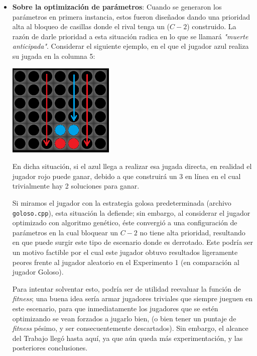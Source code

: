 \documentclass[12pt,a4paper]{article}
\begin{document}
\begin{itemize}
                \item \textbf{Sobre la optimización de parámetros}: Cuando se generaron los parámetros en primera instancia, estos fueron diseñados dando una prioridad alta al bloqueo de casillas donde el rival tenga un ($C-2$) construido. La razón de darle prioridad a esta situación radica en lo que se llamará \textit{"muerte anticipada"}. Considerar el siguiente ejemplo, en el que el jugador azul realiza su jugada en la columna 5:
                
                \begin{center}
                \includegraphics[width=0.4\textwidth]{muerteHorizontal.png}
                \end{center}
                
                En dicha situación, si el azul llega a realizar esa jugada directa, en realidad el jugador rojo puede ganar, debido a que construirá un 3 en línea en el cual trivialmente hay 2 soluciones para ganar.
                
                Si miramos el jugador con la estrategia golosa predeterminada (archivo \texttt{goloso.cpp}), esta situación la defiende; sin embargo, al considerar el jugador optimizado con algoritmo genético, éste convergió a una configuración de parámetros en la cual bloquear un $C-2$ no tiene alta prioridad, resultando en que puede surgir este tipo de escenario donde es derrotado. Este podría ser un motivo factible por el cual este jugador obtuvo resultados ligeramente peores frente al jugador aleatorio en el Experimento 1 (en comparación al jugador Goloso).
                
                Para intentar solventar esto, podría ser de utilidad reevaluar la función de \textit{fitness}; una buena idea sería armar jugadores triviales que siempre jueguen en este escenario, para que inmediatamente los jugadores que se estén optimizando se vean forzados a jugarlo bien, (o bien  tener un puntaje de \textit{fitness} pésimo, y ser consecuentemente descartados). Sin embargo, el alcance del Trabajo llegó hasta aquí, ya que aún queda más experimentación, y las posteriores conclusiones.
                
    \end{itemize}
    
\end{document}
